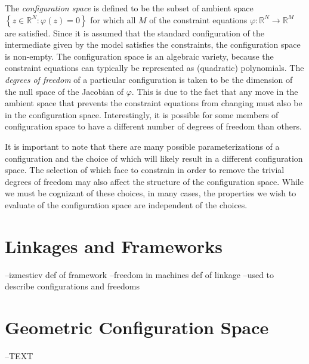 The \textit{configuration space} is defined to be the subset of ambient space $\left\{z \in \mathbb{R}^N : \varphi\left(z\right) = 0\right\}$  for which all $M$ of the constraint equations $\varphi: \mathbb{R}^N \to  \mathbb{R}^M $ are satisfied.  Since it is assumed that the standard configuration of the intermediate given by the model satisfies the constraints, the configuration space is non-empty. The configuration space is an algebraic variety, because the constraint equations can typically be represented as (quadratic) polynomials.  The \textit{degrees of freedom} of a particular configuration is taken to be the dimension of the null space of the Jacobian of $\varphi$. This is due to the fact that any move in the ambient space that prevents the constraint equations from changing must also be in the configuration space. Interestingly, it is possible for some members of configuration space to have a different number of degrees of freedom than others. 
 
It is important to note that there are many possible parameterizations of a configuration and the choice of which will likely result in a different configuration space. The selection of which face to constrain in order to remove the trivial degrees of freedom may also affect the structure of the configuration space. While we must be cognizant of these choices, in many cases, the properties we wish to evaluate of the configuration space are independent of the choices.

%
%

\section{Linkages and Frameworks}
--izmestiev def of framework
--freedom in machines def of linkage
--used to describe configurations and freedoms 


\section{Geometric Configuration Space}
--TEXT
  
